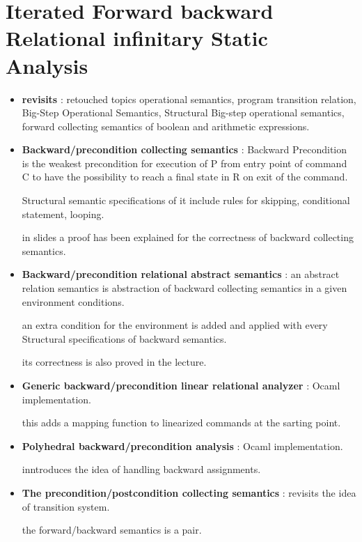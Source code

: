 \chapter{Iterated Forward backward Relational infinitary Static Analysis}

\begin{itemize}
	\item{\textbf{revisits} : retouched topics operational semantics, program transition relation, Big-Step Operational Semantics, Structural Big-step operational semantics, forward collecting semantics of boolean and arithmetic expressions.
	}

	\item{\textbf{Backward/precondition collecting semantics} : Backward Precondition is the weakest precondition for execution of P from entry point of command C to have the  possibility to reach a final state in R on exit of the command.

	Structural semantic specifications of it include rules for skipping, conditional statement, looping.

	in slides a proof has been explained for the correctness of backward collecting semantics.
	}

	\item{\textbf{Backward/precondition relational abstract semantics} :
	an abstract relation semantics is abstraction of backward collecting semantics in a given environment conditions.

	an extra condition for the environment is added and applied with every Structural specifications of backward semantics.

	its correctness is also proved in the lecture.
	}

	\item{\textbf{Generic backward/precondition linear relational analyzer} :
	Ocaml implementation.

	this adds a mapping function to linearized commands at the sarting point. 
	}

	\item{\textbf{Polyhedral backward/precondition analysis} :
	Ocaml implementation.

	inntroduces the idea of handling backward assignments.

	}

	\item{\textbf{The precondition/postcondition collecting semantics} :
	revisits the idea of transition system.

	the forward/backward semantics is a pair.

}
\end{itemize}
